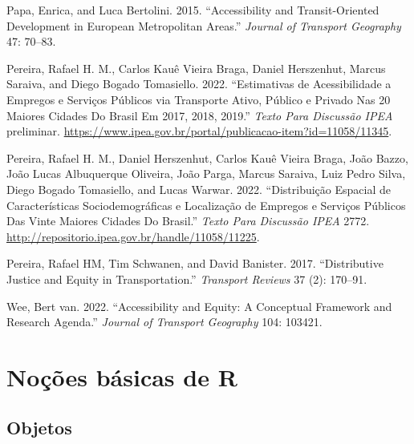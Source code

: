 \documentclass[
  letterpaper,
  DIV=11,
  numbers=noendperiod]{scrreprt}
\newlength{\cslhangindent}
\newlength{\cslentryspacingunit} %
\newenvironment{CSLReferences}[2] %
 {%
  \setlength{\parindent}{0pt}
  \ifodd #1
  \let\oldpar\par
  \def\par{\hangindent=\cslhangindent\oldpar}
  \fi
  \setlength{\parskip}{#2\cslentryspacingunit}
 }%
 {}
\begin{document}
\begin{CSLReferences}{1}{0}
\leavevmode{}%
Papa, Enrica, and Luca Bertolini. 2015. {``Accessibility and
Transit-Oriented Development in European Metropolitan Areas.''}
\emph{Journal of Transport Geography} 47: 70--83.

\leavevmode{}%
Pereira, Rafael H. M., Carlos Kauê Vieira Braga, Daniel Herszenhut,
Marcus Saraiva, and Diego Bogado Tomasiello. 2022. {``Estimativas de
Acessibilidade a Empregos e Serviços Públicos via Transporte Ativo,
Público e Privado Nas 20 Maiores Cidades Do Brasil Em 2017, 2018,
2019.''} \emph{Texto Para Discuss{ã}o IPEA} preliminar.
\url{https://www.ipea.gov.br/portal/publicacao-item?id=11058/11345}.

\leavevmode{}%
Pereira, Rafael H. M., Daniel Herszenhut, Carlos Kauê Vieira Braga, João
Bazzo, João Lucas Albuquerque Oliveira, João Parga, Marcus Saraiva, Luiz
Pedro Silva, Diego Bogado Tomasiello, and Lucas Warwar. 2022.
{``Distribuição Espacial de Características Sociodemográficas e
Localização de Empregos e Serviços Públicos Das Vinte Maiores Cidades Do
Brasil.''} \emph{Texto Para Discuss{ã}o IPEA} 2772.
\url{http://repositorio.ipea.gov.br/handle/11058/11225}.

\leavevmode{}%
Pereira, Rafael HM, Tim Schwanen, and David Banister. 2017.
{``Distributive Justice and Equity in Transportation.''} \emph{Transport
Reviews} 37 (2): 170--91.

\leavevmode{}%
Wee, Bert van. 2022. {``Accessibility and Equity: A Conceptual Framework
and Research Agenda.''} \emph{Journal of Transport Geography} 104:
103421.

\end{CSLReferences}

\appendix
{}

\hypertarget{nouxe7uxf5es-buxe1sicas-de-r}{%
\chapter{Noções básicas de R}\label{nouxe7uxf5es-buxe1sicas-de-r}}

\hypertarget{objetos}{%
\section{Objetos}\label{objetos}}
\end{document}
